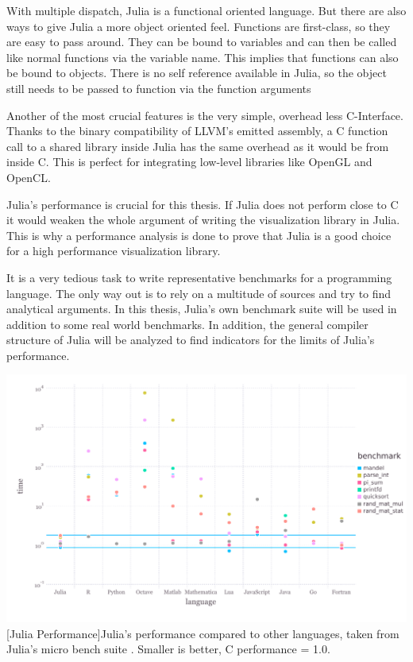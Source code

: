 With multiple dispatch, Julia is a functional oriented language. But there are also ways to give Julia a more object oriented feel.
Functions are first-class, so they are easy to pass around. 
They can be bound to variables and can then be called like normal functions via the variable name. This implies that functions can also be bound to objects.
There is no self reference available in Julia, so the object still needs to be passed to function via the function arguments

Another of the most crucial features is the very simple, overhead less C-Interface. 
Thanks to the binary compatibility of LLVM's emitted assembly, a C function call to a shared library inside Julia has the same overhead as it would be from inside C\cite{CCALL}. 
This is perfect for integrating low-level libraries like \ac{OpenGL} and \ac{OpenCL}.

Julia's performance is crucial for this thesis. 
If Julia does not perform close to C it would weaken the whole argument of writing the visualization library in Julia.
This is why a performance analysis is done to prove that Julia is a good choice for a high performance visualization library.

It is a very tedious task to write representative benchmarks for a programming language. 
The only way out is to rely on a multitude of sources and try to find analytical arguments.
In this thesis, Julia's own benchmark suite will be used in addition to some real world benchmarks.
In addition, the general compiler structure of Julia will be analyzed to find indicators for the limits of Julia's performance.

\vspace{1em}
\begin{minipage}{\linewidth}
    \centering
    \includegraphics[width=0.9\linewidth]{graphics/juliabench.pdf}
    [Julia Performance]{Julia's performance compared to other languages, taken from Julia's micro bench suite \cite{JuliaBench}. Smaller is better, C performance = 1.0.}
    \label{fig:juliabench}
\end{minipage}

